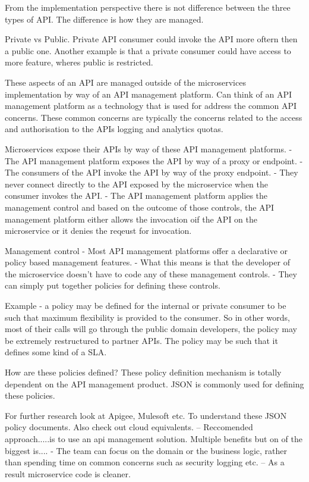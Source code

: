 From the implementation perspective there is not difference between the three types of API.
The difference is how they are managed.

Private vs Public.
Private API consumer could invoke the API more oftern then a public one.
Another example is that a private consumer could have access to more feature, wheres public is restricted.

These aspects of an API are managed outside of the microservices implementation by way of an API management platform.
Can think of an API management platform as a technology that is used for address the common API concerns.
These common concerns are typically the concerns related to the access and authorisation to the APIs logging and analytics quotas.

Microservices expose their APIs by way of these API management platforms.
- The API management platform exposes the API by way of a proxy or endpoint.
- The consumers of the API invoke the API by way of the proxy endpoint.
- They never connect directly to the API exposed by the microservice when the consumer invokes the API.
- The API management platform applies the management control and based on the outcome of those controls, the API management platform either allows the invocation oif the API on the microservice or it denies the reqeust for invocation.

Management control
- Most API management platforms offer a declarative or policy based management features.
- What this means is that the developer of the microservice doesn't have to code any of these management controls.
- They can simply put together policies for defining these controls.

Example - a policy may be defined for the internal or private consumer to be such that maximum flexibility is provided to the consumer.
So in other words, most of their calls will go through the public domain developers, the policy may be extremely restructured to partner APIs.
The policy may be such that it defines some kind of a SLA.

How are these policies defined?
These policy definition mechanism is totally dependent on the API management product.
JSON is commonly used for defining these policies.

For further research look at Apigee, Mulesoft etc.
To understand these JSON policy documents. Also check out cloud equivalents.
-- Reccomended approach.....is to use an api management solution.
Multiple benefits but on of the biggest is....
- The team can focus on the domain or the business logic, rather than spending time on common concerns such as security logging etc.
-- As a result microservice code is cleaner.

